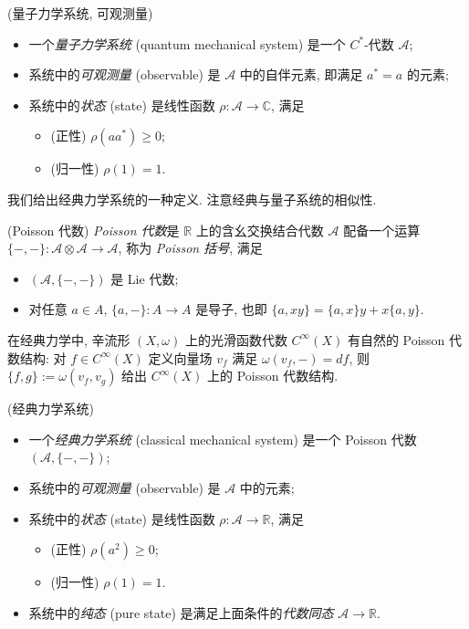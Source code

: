 \begin{definition}
	{(量子力学系统, 可观测量)}
	\begin{itemize}
		\item 一个\emph{量子力学系统} (quantum mechanical system) 是一个 $C^*$-代数 $\mathcal A$;
		\item 系统中的\emph{可观测量} (observable) 是 $\mathcal A$ 中的自伴元素, 即满足 $a^*=a$ 的元素;
		\item 系统中的\emph{状态} (state) 是线性函数 $\rho\colon \mathcal A\to \mathbb{C}$, 满足
		\begin{itemize}
			\item (正性) $\rho(aa^*)\geq 0$;
			\item (归一性) $\rho(1)=1$.
		\end{itemize}
	\end{itemize}
\end{definition}

我们给出经典力学系统的一种定义. 注意经典与量子系统的相似性.

\begin{definition}
	{(Poisson 代数)}
	\emph{Poisson 代数}是 $\mathbb{R}$ 上的含幺交换结合代数 $\mathcal A$ 配备一个运算 $\{-,-\}\colon \mathcal A\otimes \mathcal A\to \mathcal A$, 称为 \emph{Poisson 括号}, 满足
	\begin{itemize}
		\item $(\mathcal A,\{-,-\})$ 是 Lie 代数;
		\item 对任意 $a\in A$, $\{a,-\}\colon A\to A$ 是导子, 也即 $\{a,xy\}=\{a,x\}y+x\{a,y\}$.
	\end{itemize}
\end{definition}

\begin{example}
	{}
	在经典力学中, 辛流形 $(X,\omega)$ 上的光滑函数代数 $C^\infty (X)$ 有自然的 Poisson 代数结构: 对 $f\in C^\infty (X)$ 定义向量场 $v_f$ 满足 $\omega(v_f,-) = df$, 则 $\{f,g\}:=\omega(v_f,v_g)$ 给出 $C^\infty (X)$ 上的 Poisson 代数结构.
\end{example}

\begin{definition}
	[label={classical-mechanical-system}]
	{(经典力学系统)}
	\begin{itemize}
		\item 一个\emph{经典力学系统} (classical mechanical system) 是一个 Poisson 代数 $(\mathcal A,\{-,-\})$;
		\item 系统中的\emph{可观测量} (observable) 是 $\mathcal A$ 中的元素;
		\item 系统中的\emph{状态} (state) 是线性函数 $\rho\colon \mathcal A\to \mathbb{R}$, 满足
		\begin{itemize}
			\item (正性) $\rho(a^2)\geq 0$;
			\item (归一性) $\rho(1)=1$.
		\end{itemize}
		\item 系统中的\emph{纯态} (pure state) 是满足上面条件的\emph{代数同态} $\mathcal A\to\mathbb{R}$.
	\end{itemize}
\end{definition}

